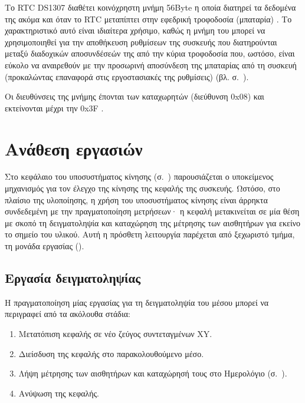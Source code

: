 Το RTC DS1307 διαθέτει κοινόχρηστη μνήμη 56Byte η οποία διατηρεί τα δεδομένα της
ακόμα και όταν το RTC μεταπίπτει στην εφεδρική τροφοδοσία (μπαταρία)
\parencite[1]{ds1307}. Το χαρακτηριστικό αυτό είναι ιδιαίτερα χρήσιμο, καθώς η
μνήμη του μπορεί να χρησιμοποιηθεί για την αποθήκευση ρυθμίσεων της συσκευής που
διατηρούνται μεταξύ διαδοχικών αποσυνδέσεών της από την κύρια τροφοδοσία που,
ωστόσο, είναι εύκολο να αναιρεθούν με την προσωρινή αποσύνδεση της μπαταρίας από
τη συσκευή (προκαλώντας επαναφορά στις εργοστασιακές της ρυθμίσεις) (βλ.
 σ.~\pageref{subsec:backup-memory}).

Οι διευθύνσεις της μνήμης έπονται των καταχωρητών (διεύθυνση 0x08) και
εκτείνονται μέχρι την 0x3F \parencite[8]{ds1307}.



\section{Ανάθεση εργασιών}
\label{sec:task}

Στο κεφάλαιο του υποσυστήματος κίνησης (σ.~\pageref{ch:motor})
παρουσιάζεται ο υποκείμενος μηχανισμός για τον έλεγχο της κίνησης της κεφαλής
της συσκευής.
Ωστόσο, στο πλαίσιο της υλοποίησης, η χρήση του υποσυστήματος κίνησης είναι
άρρηκτα συνδεδεμένη με την πραγματοποίηση μετρήσεων· η κεφαλή μετακινείται σε
μία
θέση με σκοπό τη δειγματοληψία και καταχώρηση της μέτρησης των αισθητήρων για
εκείνο το σημείο του υλικού. Αυτή η πρόσθετη λειτουργία παρέχεται από ξεχωριστό
τμήμα, τη μονάδα εργασίας ().


\subsection{Εργασία δειγματοληψίας}

Η πραγματοποίηση μίας εργασίας για τη δειγματοληψία του μέσου μπορεί να
περιγραφεί από τα ακόλουθα στάδια:
\begin{enumerate}
    \item Μετατόπιση κεφαλής σε νέο ζεύγος συντεταγμένων XY.
    \item Διείσδυση της κεφαλής στο παρακολουθούμενο μέσο.
    \item Λήψη μέτρησης των αισθητήρων και καταχώρησή τους στο Ημερολόγιο
    (σ.~\pageref{sec:log}).
    \item Ανύψωση της κεφαλής.
\end{enumerate}

